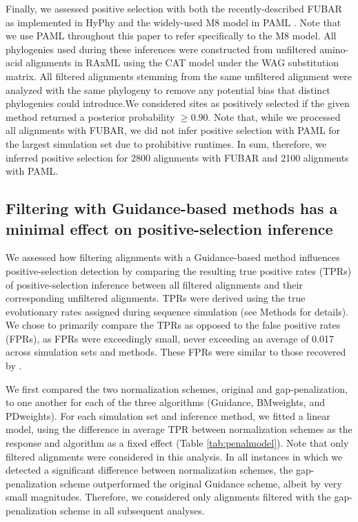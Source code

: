 \documentclass[10pt]{article}
\begin{document}
Finally, we assessed positive selection with both the recently-described FUBAR \citep{Murrell2013} as implemented in HyPhy \citep{Pond2005} and the widely-used M8 model in PAML \citep{Yang2007}. Note that we use PAML throughout this paper to refer specifically to the M8 model.  All phylogenies used during these inferences were constructed from unfiltered amino-acid alignments in RAxML \citep{Stamatakis2006} using the CAT model under the WAG substitution matrix. All filtered alignments stemming from the same unfiltered alignment were analyzed with the same phylogeny to remove any potential bias that distinct phylogenies could introduce.We considered sites as positively selected if the given method returned a posterior probability $\geq0.90$. Note that, while we processed all alignments with FUBAR, we did not infer positive selection with PAML for the largest simulation set due to prohibitive runtimes. In sum, therefore, we inferred positive selection for 2800 alignments with FUBAR and 2100 alignments with PAML.


\subsection*{Filtering with Guidance-based methods has a minimal effect on positive-selection inference}

We assessed how filtering alignments with a Guidance-based method influences positive-selection detection by comparing the resulting true positive rates (TPRs) of positive-selection inference between all filtered alignments and their corresponding unfiltered alignments. TPRs were derived using the true evolutionary rates assigned during sequence simulation (see Methods for details). We chose to primarily compare the TPRs as opposed to the false positive rates (FPRs), as FPRs were exceedingly small, never exceeding an average of 0.017 across simulation sets and methods. These FPRs were similar to those recovered by \citet{Jordan2012}. 

We first compared the two normalization schemes, original and gap-penalization, to one another for each of the three algorithms (Guidance, BMweights, and PDweights). For each simulation set and inference method, we fitted a linear model, using the difference in average TPR between normalization schemes as the response and algorithm as a fixed effect (Table \ref{tab:penalmodel}). Note that only filtered alignments were considered in this analysis. In all instances in which we detected a significant difference between normalization schemes, the gap-penalization scheme outperformed the original Guidance scheme, albeit by very small magnitudes. Therefore, we considered only alignments filtered with the gap-penalization scheme in all subsequent analyses.
\end{document}
